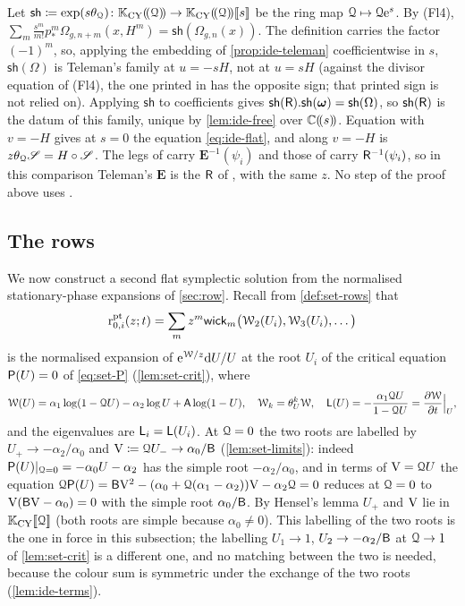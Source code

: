 \begin{rmk}
\label{rmk:ide-tel77}
Let $\mathsf{sh}\coloneqq\exp(s\theta_{\mathcal{Q}})\colon\mathbb{K}_{\mathrm{CY}}(\!(\mathcal{Q})\!)\to\mathbb{K}_{\mathrm{CY}}(\!(\mathcal{Q})\!)[\![ s ]\!]$ be the ring map $\mathcal{Q}\mapsto\mathcal{Q}\mathrm{e}^{s}$. By (Fl4), $\sum_m\frac{s^m}{m!}p^m_*\Omega_{g,n+m}(x,H^m)=\mathsf{sh}(\Omega_{g,n}(x))$. The definition \cite[Def.~7.1]{Tel12} carries the factor $(-1)^m$, so, applying the embedding of \cref{prop:ide-teleman} coefficientwise in $s$, $\mathsf{sh}(\Omega)$ is Teleman's family at $u=-sH$, not at $u=sH$ (against the divisor equation of (Fl4), the one printed in \cite[Example~7.17]{Tel12} has the opposite sign; that printed sign is not relied on). Applying $\mathsf{sh}$ to coefficients gives $\mathsf{sh}(\mathsf{R}).\mathsf{sh}(\boldsymbol{\omega})=\mathsf{sh}(\Omega)$, so $\mathsf{sh}(\mathsf{R})$ is the datum of this family, unique by \cref{lem:ide-free} over $\mathbb{C}(\!(s)\!)$. Equation \cite[(7.7.a)]{Tel12} with $v=-H$ gives at $s=0$ the equation \cref{eq:ide-flat}, and \cite[Prop.~8.2(ii)]{Tel12} along $v=-H$ is $z\theta_{\mathcal{Q}}\mathscr{S}=H\circ\mathscr{S}$. The legs of \cite[(7.6)]{Tel12} carry $\mathbf{E}^{-1}(\psi_i)$ and those of \cite[Def.~2.2]{PPZ15} carry $\mathsf{R}^{-1}(\psi_i)$, so in this comparison Teleman's $\mathbf{E}$ is the $\mathsf{R}$ of \cite{PPZ15}, with the same $z$. No step of the proof above uses \cite[Prop.~7.7, Prop.~8.2(ii) or Example~7.17]{Tel12}.
\end{rmk}

\subsection{The rows}

We now construct a second flat symplectic solution from the normalised stationary-phase expansions of \cref{sec:row}. Recall from \cref{def:set-rows} that
\[
\mathrm{r}^{\mathrm{pt}}_{0,i}(z;t)=\sum_mz^m\mathsf{wick}_m\big(\mathcal{W}_2(U_i),\mathcal{W}_3(U_i),\dots\big)
\]
is the normalised expansion of $\mathrm{e}^{\mathcal{W}/z}\mathrm{d} U/U$ at the root $U_i$ of the critical equation $\mathsf{P}(U)=0$ of \eqref{eq:set-P} (\cref{lem:set-crit}), where
\[
\mathcal{W}(U)=\alpha_1\log(1-\mathcal{Q} U)-\alpha_2\log U+\mathsf{A}\log(1-U),\quad\mathcal{W}_k=\theta_{U}^k\mathcal{W},\quad
\mathsf{L}(U)=-\frac{\alpha_1\mathcal{Q} U}{1-\mathcal{Q} U}=\frac{\partial\mathcal{W}}{\partial t}\Big|_U ,
\]
and the eigenvalues are $\mathsf{L}_i=\mathsf{L}(U_i)$. At $\mathcal{Q}=0$ the two roots are labelled by $U_+\to-\alpha_2/\alpha_0$ and $\mathrm{V}\coloneqq\mathcal{Q} U_-\to\alpha_0/\mathsf{B}$ (\cref{lem:set-limits}): indeed $\mathsf{P}(U)|_{\mathcal{Q}=0}=-\alpha_0U-\alpha_2$ has the simple root $-\alpha_2/\alpha_0$, and in terms of $\mathrm{V}=\mathcal{Q} U$ the equation $\mathcal{Q}\mathsf{P}(U)=\mathsf{B}\mathrm{V}^2-(\alpha_0+\mathcal{Q}(\alpha_1-\alpha_2))\mathrm{V}-\alpha_2\mathcal{Q}=0$ reduces at $\mathcal{Q}=0$ to $\mathrm{V}(\mathsf{B}\mathrm{V}-\alpha_0)=0$ with the simple root $\alpha_0/\mathsf{B}$. By Hensel's lemma $U_+$ and $\mathrm{V}$ lie in $\mathbb{K}_{\mathrm{CY}}[\![ \mathcal{Q} ]\!]$ (both roots are simple because $\alpha_0\neq 0$). This labelling of the two roots is the one in force in this subsection; the labelling $U_1\to 1$, $U_2\to-\alpha_2/\mathsf{B}$ at $\mathcal{Q}\to 1$ of \cref{lem:set-crit} is a different one, and no matching between the two is needed, because the colour sum is symmetric under the exchange of the two roots (\cref{lem:ide-terms}).

